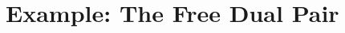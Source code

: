 \documentclass[pra,floatfix,
amsmath,superscriptaddress, 12pt]{article}
\theoremstyle{definition}
\newcommand{\coev}{\mathsf{coev}}
\begin{document}

\section{Example: The Free Dual Pair}\label{ex:TheFreeDualPair}
\end{document}
